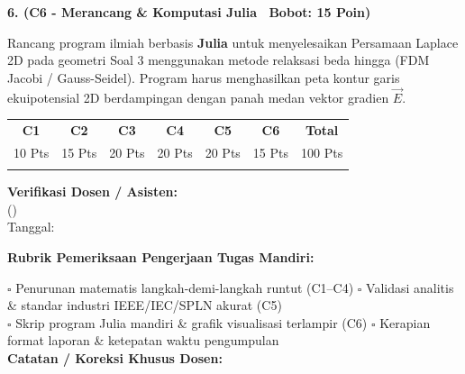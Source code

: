 \documentclass[10pt,a4paper]{article}
\begin{document}
\vspace{3.5mm}

\noindent\textbf{6. (C6 - Merancang \& Komputasi Julia \textbar\ Bobot: 15 Poin)}\par\vspace{0.8mm}
{\footnotesize Rancang program ilmiah berbasis \textbf{Julia} untuk menyelesaikan Persamaan Laplace 2D pada geometri Soal 3 menggunakan metode relaksasi beda hingga (FDM Jacobi / Gauss-Seidel). Program harus menghasilkan peta kontur garis ekuipotensial 2D berdampingan dengan panah medan vektor gradien $\vec{E}$.}\par

\vfill

\noindent\begin{minipage}[b]{0.62\textwidth}%
  \centering
  \scriptsize
  \begin{tabular}{|c|c|c|c|c|c|c|}
    \hline
    \rowcolor{unibblue}
    \textbf{\color{white}C1} & \textbf{\color{white}C2} & \textbf{\color{white}C3} & \textbf{\color{white}C4} & \textbf{\color{white}C5} & \textbf{\color{white}C6} & \textbf{\color{white}Total} \\
    \rowcolor{unibblue!10}
    10 Pts & 15 Pts & 20 Pts & 20 Pts & 20 Pts & 15 Pts & 100 Pts \\
    \hline
    & & & & & & \\[3mm]
    \hline
  \end{tabular}%
\end{minipage}%
\hfill%
\begin{minipage}[b]{0.35\textwidth}%
  \centering
  \scriptsize
  \textbf{Verifikasi Dosen / Asisten:}\\[6mm]
  (\dotfill)\\[1mm]
  \tiny Tanggal: \dotfill
\end{minipage}\par

\vspace{2mm}
\begin{tcolorbox}[colback=white,colframe=unibblue!40!black,colbacktitle=unibblue!10,coltitle=unibblue,boxrule=0.5pt,arc=2pt,left=5pt,right=5pt,top=3pt,bottom=3pt,title=\textbf{\tiny Catatan Evaluasi \& Umpan Balik Dosen Pengampu}]
  \tiny
  \textbf{Rubrik Pemeriksaan Pengerjaan Tugas Mandiri:}\par\vspace{0.8mm}
  $\square$ Penurunan matematis langkah-demi-langkah runtut (C1--C4) \hfill $\square$ Validasi analitis \& standar industri IEEE/IEC/SPLN akurat (C5)\\[0.8mm]
  $\square$ Skrip program Julia mandiri \& grafik visualisasi terlampir (C6) \hfill $\square$ Kerapian format laporan \& ketepatan waktu pengumpulan\\[2.0mm]
  \textbf{Catatan / Koreksi Khusus Dosen:}\\[1.6cm]
\end{tcolorbox}
\end{document}
